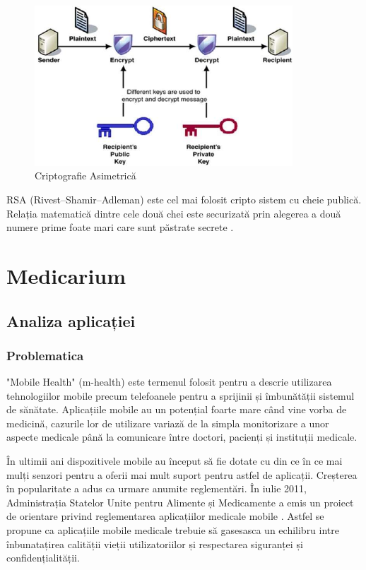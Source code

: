 \documentclass[12pt]{article}
\begin{document}
\begin{figure}[H]
    \centering
    \includegraphics[height=6cm]{public_key_cryptography.jpg}
    \caption{Criptografie Asimetrică \cite{tutrsa}}
    \end{figure}

RSA (Rivest–Shamir–Adleman) este cel mai folosit cripto sistem cu cheie publică. Relația matematică 
dintre cele două chei este securizată prin alegerea a două numere prime foate mari care sunt păstrate secrete \cite{barton2012regulation}.


\newpage
\section{Medicarium}
\subsection{Analiza aplicației}
\subsubsection{Problematica}


"Mobile Health" (m-health) \cite{kahn2010mobile}
este termenul folosit pentru a descrie utilizarea tehnologiilor mobile precum telefoanele pentru
a sprijinii și îmbunătății sistemul de sănătate. Aplicațiile mobile au un potențial foarte mare când vine vorba de medicină, cazurile lor
de utilizare variază de la simpla monitorizare a unor aspecte medicale până la 
comunicare între doctori, pacienți și instituții medicale.

În ultimii ani dispozitivele mobile au început să fie dotate cu din ce în ce mai mulți
senzori pentru a oferii mai mult suport pentru astfel de aplicații. Creșterea în popularitate a adus ca urmare anumite reglementări.
În iulie 2011, Administrația Statelor Unite pentru Alimente și Medicamente a emis un proiect de orientare privind 
reglementarea aplicațiilor medicale mobile \cite{barton2012regulation}. Astfel se propune ca aplicațiile
mobile medicale trebuie să gasesasca un echilibru intre înbunatațirea calității vieții utilizatoriilor și 
respectarea siguranței și confidențialității.
\end{document}
